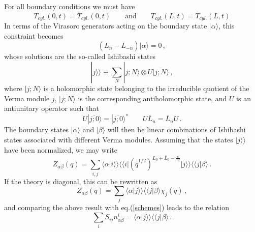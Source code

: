 \documentclass[a4paper,12pt]{report}
\begin{document}
For all boundary conditions we must have
\begin{equation}
T_{cyl.}(0,t)=\overline{T}_{cyl.}(0,t)\qquad \textrm{and}\qquad T_{cyl.}(L,t)=\overline{T}_{cyl.}(L,t)
\end{equation}
In terms of the Virasoro generators acting on the boundary state $|\alpha\rangle$, this constraint becomes
\begin{equation}
\left(L_{n}-\bar{L}_{-n}\right)|\alpha\rangle=0\,,
\end{equation}
whose solutions are the so-called Ishibashi states
\begin{equation}
|j\rangle\rangle\equiv\sum_{N}|j;N\rangle\otimes U |\overline{j;N}\rangle\,,
\end{equation}
where $|j;N\rangle$ is a holomorphic state belonging to the irreducible quotient of the Verma module $j$,
$|\overline{j;N}\rangle$ is the corresponding antiholomorphic state, and $U$ is an antiunitary operator such that
\begin{equation}
U|\overline{j;0}\rangle=|\overline{j;0}\rangle^{*}\qquad U\bar{L}_{n}=\bar{L}_{n}U\,.
\end{equation}
The boundary states $|\alpha\rangle$ and $|\beta\rangle$ will then be linear combinations of Ishibashi states
associated with different Verma modules. Assuming that the states $|j\rangle\rangle$ have been normalized, we may
write
\begin{equation}
Z_{\alpha\beta}(q)=\sum_{i,j}\langle\alpha|i\rangle\rangle\langle\langle i|
\left(\tilde{q}^{1/2}\right)^{L_{0}+\bar{L}_{0}-\frac{c}{12}}|j\rangle\rangle\langle\langle j|\beta\rangle\,.
\end{equation}
If the theory is diagonal, this can be rewritten as
\begin{equation}
Z_{\alpha\beta}(q)=\sum_{j}\langle\alpha|j\rangle\rangle\langle\langle j|\beta\rangle\chi_{j}(\tilde{q})\,,
\end{equation}
and comparing the above result with eq.(\ref{schemes}) leads to the relation
\begin{equation}
\sum_{i}S_{ij}n_{\alpha\beta}^{i}=\langle\alpha|j\rangle\rangle\langle\langle j|\beta\rangle\,.
\end{equation}
\end{document}
